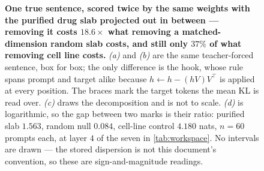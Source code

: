 \begin{figure}[htbp]
  \begin{fullwidth}
  \centering
  
  \caption[The causal measurement]{\textbf{One true sentence, scored twice by the
same weights with the purified drug slab projected out in between --- removing
it costs $18.6\times$ what removing a matched-dimension random slab costs, and
still only $37\%$ of what removing cell line costs.} \emph{(a)} and \emph{(b)}
are the same teacher-forced sentence, box for box; the only difference is the
hook, whose rule spans prompt and target alike because $h \leftarrow h -
(hV)V^{\top}$ is applied at every position. The braces mark the target tokens
the mean KL is read over. \emph{(c)} draws the decomposition and is not to
scale. \emph{(d)} is logarithmic, so the gap between two marks is their ratio:
purified slab $1.563$, random null $0.084$, cell-line control $4.180$ nats,
$n = 60$ prompts each, at layer $4$ of the seven in \cref{tab:workspace}. No
intervals are drawn --- the stored dispersion is not this document's
convention, so these are sign-and-magnitude readings.}
  \label{fig:hook}
  \end{fullwidth}
  \end{figure}
  

